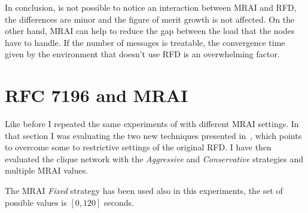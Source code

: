 In conclusion, is not possible to notice an interaction between \ac{MRAI} and
\ac{RFD}, the differences are minor and the figure of merit growth is not
affected.
On the other hand, \ac{MRAI} can help to reduce the gap between the load that
the nodes have to handle.
If the number of messages is treatable, the convergence time given by the
environment that doesn't use \ac{RFD} is an overwhelming factor.


\section{RFC 7196 and MRAI}
\label{sec:bgp_rfd_comparison}

%
%

Like before I repeated the same experiments of  with
different \ac{MRAI} settings.
In that section I was evaluating the two new techniques presented in~\cite{rfc7196},
which points to overcome some to restrictive settings of the original \ac{RFD}.
I have then evaluated the clique network with the \textit{Aggressive} and
\textit{Conservative} strategies and multiple \ac{MRAI} values.

The \ac{MRAI} \textit{Fixed} strategy has been used also in this experiments,
the set of possible values is \([0, 120]\) seconds.

